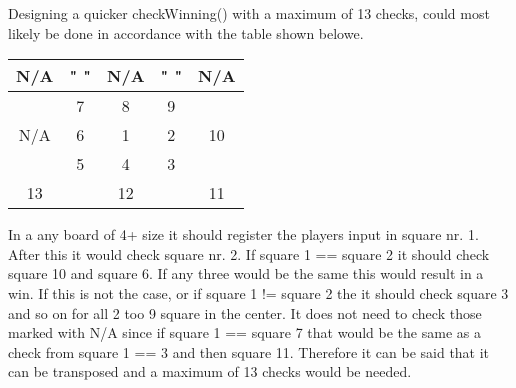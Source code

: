 \documentclass[a4paper,10pt]{article}
\begin{document}
	Designing a quicker checkWinning() with a maximum of 13 checks, could most likely be done in accordance with the table shown belowe.   
	
	\centering
	\begin{tabular}{|c|c|c|c|c|}
		\hline 
		N/A &"    "& N/A &"    "& N/A \\ 
		\hline 
		& 7 & 8 & 9 &   \\ 
		\hline 
		N/A & 6 & 1 & 2 & 10 \\ 
		\hline 
		& 5 & 4 & 3 &  \\ 
		\hline 
		13 &    & 12 &    & 11 \\ 
		\hline 
	\end{tabular} 
	
	
	\flushleft
	
	In a any board of 4+ size it should register the players input in square nr. 1. After this it would check square nr. 2. If square 1 == square 2 it should check square 10 and square 6. If any three would be the same this would result in a win. If this is not the case, or if square 1 != square 2 the it should check square 3 and so on for all 2 too 9 square in the center. It does not need to check those marked with N/A since if  square 1 == square 7 that would be the same as a check from square 1 == 3 and then square 11. Therefore it can be said that it can be transposed and a maximum of 13 checks would be needed.  
	
	
	\begin{comment}
	Hvis Fern Time er lavet tilføjes det her og begin og end comment skal fjernes. 
	\textbf{Fern program}
	
	
	\end{comment}
	
\end{document}
